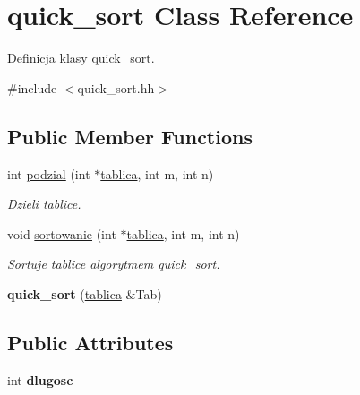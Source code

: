 \hypertarget{classquick__sort}{\section{quick\-\_\-sort \-Class \-Reference}
\label{classquick__sort}
}


\-Definicja klasy \hyperlink{classquick__sort}{quick\-\_\-sort}.  




{\ttfamily \#include $<$quick\-\_\-sort.\-hh$>$}

\subsection*{\-Public \-Member \-Functions}
\begin{DoxyCompactItemize}
\item 
int \hyperlink{classquick__sort_ac7662bc98e198bcde63da53dd8a73766}{podzial} (int $\ast$\hyperlink{classtablica}{tablica}, int m, int n)
\begin{DoxyCompactList}\small\item\em \-Dzieli tablice. \end{DoxyCompactList}\item 
void \hyperlink{classquick__sort_a521710deada27c086ab065f8d1ad6bd4}{sortowanie} (int $\ast$\hyperlink{classtablica}{tablica}, int m, int n)
\begin{DoxyCompactList}\small\item\em \-Sortuje tablice algorytmem \hyperlink{classquick__sort}{quick\-\_\-sort}. \end{DoxyCompactList}\item 
\hypertarget{classquick__sort_a6cb8d0edf6e9501f766c5ba77ce37a6b}{{\bfseries quick\-\_\-sort} (\hyperlink{classtablica}{tablica} \&\-Tab)}\label{classquick__sort_a6cb8d0edf6e9501f766c5ba77ce37a6b}

\end{DoxyCompactItemize}
\subsection*{\-Public \-Attributes}
\begin{DoxyCompactItemize}
\item 
\hypertarget{classquick__sort_a7d9df8d9808d9c23b156add5724d9744}{int {\bfseries dlugosc}}\label{classquick__sort_a7d9df8d9808d9c23b156add5724d9744}

\end{DoxyCompactItemize}


